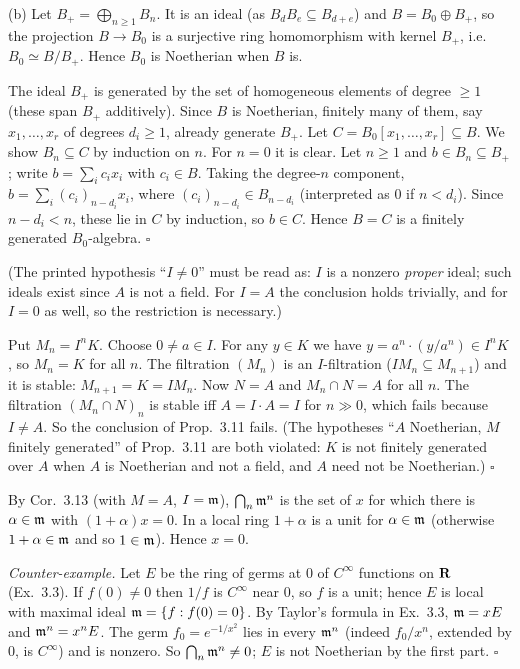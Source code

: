 \documentclass[11pt]{article}
\begin{document}
(b) Let $B_+=\bigoplus_{n\ge1}B_n$. It is an ideal (as $B_dB_e\subseteq B_{d+e}$) and $B=B_0\oplus B_+$, so the projection $B\to B_0$ is a surjective ring homomorphism with kernel $B_+$, i.e.\ $B_0\simeq B/B_+$. Hence $B_0$ is Noetherian when $B$ is.

The ideal $B_+$ is generated by the set of homogeneous elements of degree $\ge1$ (these span $B_+$ additively). Since $B$ is Noetherian, finitely many of them, say $x_1,\dots,x_r$ of degrees $d_i\ge1$, already generate $B_+$. Let $C=B_0[x_1,\dots,x_r]\subseteq B$. We show $B_n\subseteq C$ by induction on $n$. For $n=0$ it is clear. Let $n\ge1$ and $b\in B_n\subseteq B_+$; write $b=\sum_ic_ix_i$ with $c_i\in B$. Taking the degree-$n$ component, $b=\sum_i(c_i)_{n-d_i}x_i$, where $(c_i)_{n-d_i}\in B_{n-d_i}$ (interpreted as $0$ if $n<d_i$). Since $n-d_i<n$, these lie in $C$ by induction, so $b\in C$. Hence $B=C$ is a finitely generated $B_0$-algebra. \hfill$\square$

\pf
(The printed hypothesis ``$I\ne0$'' must be read as: $I$ is a nonzero \emph{proper} ideal; such ideals exist since $A$ is not a field. For $I=A$ the conclusion holds trivially, and for $I=0$ as well, so the restriction is necessary.)

Put $M_n=I^nK$. Choose $0\ne a\in I$. For any $y\in K$ we have $y=a^n\cdot(y/a^n)\in I^nK$, so $M_n=K$ for all $n$. The filtration $(M_n)$ is an $I$-filtration ($IM_n\subseteq M_{n+1}$) and it is stable: $M_{n+1}=K=IM_n$. Now $N=A$ and $M_n\cap N=A$ for all $n$. The filtration $(M_n\cap N)_n$ is stable iff $A=I\cdot A=I$ for $n\gg0$, which fails because $I\ne A$. So the conclusion of Prop.~3.11 fails. (The hypotheses ``$A$ Noetherian, $M$ finitely generated'' of Prop.~3.11 are both violated: $K$ is not finitely generated over $A$ when $A$ is Noetherian and not a field, and $A$ need not be Noetherian.) \hfill$\square$

\pf
By Cor.~3.13 (with $M=A$, $I=\mathfrak m$), $\bigcap_n\mathfrak m^n$ is the set of $x$ for which there is $\alpha\in\mathfrak m$ with $(1+\alpha)x=0$. In a local ring $1+\alpha$ is a unit for $\alpha\in\mathfrak m$ (otherwise $1+\alpha\in\mathfrak m$ and so $1\in\mathfrak m$). Hence $x=0$.

\emph{Counter-example.} Let $E$ be the ring of germs at $0$ of $C^\infty$ functions on $\mathbf R$ (Ex.~3.3). If $f(0)\ne0$ then $1/f$ is $C^\infty$ near $0$, so $f$ is a unit; hence $E$ is local with maximal ideal $\mathfrak m=\{f:f(0)=0\}$. By Taylor's formula in Ex.~3.3, $\mathfrak m=xE$ and $\mathfrak m^n=x^nE$. The germ $f_0=e^{-1/x^2}$ lies in every $\mathfrak m^n$ (indeed $f_0/x^n$, extended by $0$, is $C^\infty$) and is nonzero. So $\bigcap_n\mathfrak m^n\ne0$; $E$ is not Noetherian by the first part. \hfill$\square$
\end{document}
